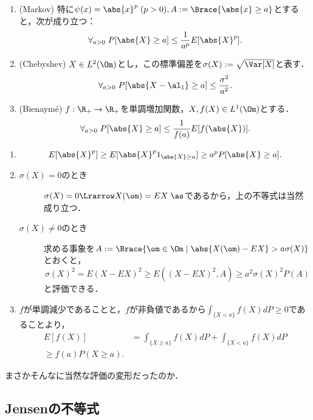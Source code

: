 \documentclass[uplatex,dvipdfmx]{jsreport}
\begin{document}
\begin{corollary}\mbox{}\label{cor-Chebyshev-inequality}
    \begin{enumerate}
        \item (Markov) 特に$\psi(x)=\abs{x}^p\;(p>0),A:=\Brace{\abs{x}\ge a}$とすると，次が成り立つ：\[\forall_{a>0}\;P[\abs{X}\ge a]\le\frac{1}{a^p}E[\abs{X}^p].\]
        \item (Chebyshev) $X\in L^2(\Om)$とし，この標準偏差を$\sigma(X):=\sqrt{\Var[X]}$と表す．
        \[\forall_{a>0}\;P[\abs{X-\al_1}\ge a]\le\frac{\sigma^2}{a^2}.\]
        \item (Bienaym\'{e}) $f:\R_+\to\R_+$を単調増加関数，$X,f(X)\in L^1(\Om)$とする．
        \[\forall_{a>0}\;P[\abs{X}\ge a]\le\frac{1}{f(a)}E[f(\abs{X})].\]
    \end{enumerate}
\end{corollary}
\begin{Proof}\mbox{}
    \begin{enumerate}
        \item \[E[\abs{X}^p]\ge E[\abs{X}^p1_{\abs{X}\ge a}]\ge a^pP[\abs{X}\ge a].\]
        \item 
    \begin{description}
        \item[$\sigma(X)=0$のとき] $\sigma(X)=0\Lrarrow X(\om)=EX\;\as$であるから，上の不等式は当然成り立つ．
        \item[$\sigma(X)\ne0$のとき] 求める事象を$A:=\Brace{\om\in\Om\mid\abs{X(\om)-EX}>a\sigma(X)}$とおくと，
        \[\sigma(X)^2=E(X-EX)^2\ge E((X-EX)^2,A)\ge a^2\sigma(X)^2P(A)\]
        と評価できる．
    \end{description}
        \item $f$が単調減少であることと，$f$が非負値であるから$\int_{\{X<a\}}f(X)dP\ge 0$であることより，
        \begin{align*}
            E[f(X)]&=\int_{\{X\ge a\}}f(X)dP+\int_{\{X< a\}}f(X)dP\\
            \ge f(a)P(X\ge a).
        \end{align*}
    \end{enumerate}
\end{Proof}
\begin{remarks}
    まさかそんなに当然な評価の変形だったのか．
\end{remarks}

\subsection{Jensenの不等式}
\end{document}
